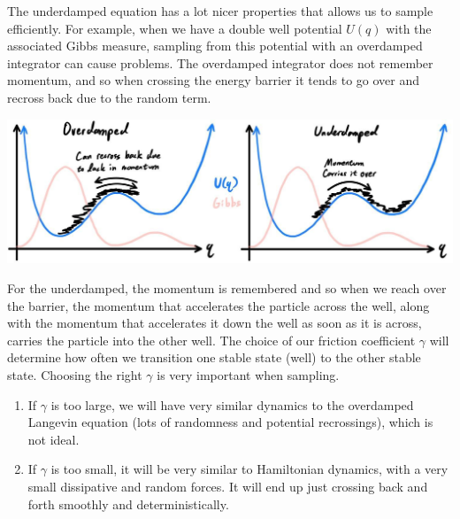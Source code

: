     The underdamped equation has a lot nicer properties that allows us to sample efficiently. For example, when we have a double well potential $U(q)$ with the associated Gibbs measure, sampling from this potential with an overdamped integrator can cause problems. The overdamped integrator does not remember momentum, and so when crossing the energy barrier it tends to go over and recross back due to the random term. 
    \begin{center}
      \includegraphics[scale=0.25]{img/double_well.jpg}
    \end{center}
    For the underdamped, the momentum is remembered and so when we reach over the barrier, the momentum that accelerates the particle across the well, along with the momentum that accelerates it down the well as soon as it is across, carries the particle into the other well. The choice of our friction coefficient $\gamma$ will determine how often we transition one stable state (well) to the other stable state. Choosing the right $\gamma$ is very important when sampling. 
    \begin{enumerate}
      \item If $\gamma$ is too large, we will have very similar dynamics to the overdamped Langevin equation (lots of randomness and potential recrossings), which is not ideal.
      \item If $\gamma$ is too small, it will be very similar to Hamiltonian dynamics, with a very small dissipative and random forces. It will end up just crossing back and forth smoothly and deterministically. 
    \end{enumerate}


